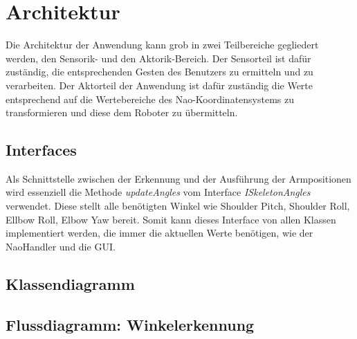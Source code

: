 %
%
%		
\section{Architektur}
Die Architektur der Anwendung kann grob in zwei Teilbereiche gegliedert werden, den Sensorik- und den Aktorik-Bereich.
Der Sensorteil ist dafür zuständig, die entsprechenden Gesten des Benutzers zu ermitteln und zu verarbeiten. Der Aktorteil der Anwendung ist dafür zuständig die Werte entsprechend auf die Wertebereiche des Nao-Koordinatensystems zu transformieren und diese dem Roboter zu übermitteln.


\subsection{Interfaces}
Als Schnittstelle zwischen der Erkennung und der Ausführung der Armpositionen wird essenziell die Methode \textit{updateAngles} vom Interface \textit{ISkeletonAngles} verwendet. Diese stellt alle benötigten Winkel wie Shoulder Pitch, Shoulder Roll, Ellbow Roll, Elbow Yaw bereit. Somit kann dieses Interface von allen Klassen implementiert werden, die immer die aktuellen Werte benötigen, wie der NaoHandler und die GUI.

\subsection{Klassendiagramm}

\subsection{Flussdiagramm: Winkelerkennung}

